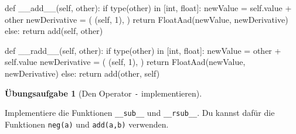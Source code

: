 \documentclass[
  a4paper,
  DIV=11]{scrreprt}
\newenvironment{Shaded}{\begin{snugshade}}{\end{snugshade}}
\newcommand{\BuiltInTok}[1]{\textcolor[rgb]{0.00,0.23,0.31}{#1}}
\newcommand{\ControlFlowTok}[1]{\textcolor[rgb]{0.00,0.23,0.31}{#1}}
\newcommand{\DecValTok}[1]{\textcolor[rgb]{0.68,0.00,0.00}{#1}}
\newcommand{\FunctionTok}[1]{\textcolor[rgb]{0.28,0.35,0.67}{#1}}
\newcommand{\KeywordTok}[1]{\textcolor[rgb]{0.00,0.23,0.31}{#1}}
\newcommand{\NormalTok}[1]{\textcolor[rgb]{0.00,0.23,0.31}{#1}}
\newcommand{\OperatorTok}[1]{\textcolor[rgb]{0.37,0.37,0.37}{#1}}
\newcommand{\VariableTok}[1]{\textcolor[rgb]{0.07,0.07,0.07}{#1}}
\theoremstyle{definition}
\newtheorem{exercise}{Übungsaufgabe}[chapter]
\theoremstyle{definition}
\theoremstyle{remark}
\begin{document}
\begin{Shaded}
\begin{Highlighting}[]
\KeywordTok{def} \FunctionTok{\_\_add\_\_}\NormalTok{(}\VariableTok{self}\NormalTok{, other):}
    \ControlFlowTok{if} \BuiltInTok{type}\NormalTok{(other) }\KeywordTok{in}\NormalTok{ [}\BuiltInTok{int}\NormalTok{, }\BuiltInTok{float}\NormalTok{]:}
\NormalTok{        newValue }\OperatorTok{=} \VariableTok{self}\NormalTok{.value }\OperatorTok{+}\NormalTok{ other}
\NormalTok{        newDerivative }\OperatorTok{=}\NormalTok{ (}
\NormalTok{            (}\VariableTok{self}\NormalTok{, }\DecValTok{1}\NormalTok{),}
\NormalTok{        )}
        \ControlFlowTok{return}\NormalTok{ FloatAad(newValue, newDerivative)}
    \ControlFlowTok{else}\NormalTok{:}
        \ControlFlowTok{return}\NormalTok{ add(}\VariableTok{self}\NormalTok{, other)}
    
\KeywordTok{def} \FunctionTok{\_\_radd\_\_}\NormalTok{(}\VariableTok{self}\NormalTok{, other):}
    \ControlFlowTok{if} \BuiltInTok{type}\NormalTok{(other) }\KeywordTok{in}\NormalTok{ [}\BuiltInTok{int}\NormalTok{, }\BuiltInTok{float}\NormalTok{]:}
\NormalTok{        newValue }\OperatorTok{=}\NormalTok{ other }\OperatorTok{+} \VariableTok{self}\NormalTok{.value}
\NormalTok{        newDerivative }\OperatorTok{=}\NormalTok{ (}
\NormalTok{            (}\VariableTok{self}\NormalTok{, }\DecValTok{1}\NormalTok{),}
\NormalTok{        )}
        \ControlFlowTok{return}\NormalTok{ FloatAad(newValue, newDerivative)}
    \ControlFlowTok{else}\NormalTok{:}
        \ControlFlowTok{return}\NormalTok{ add(other, }\VariableTok{self}\NormalTok{)}
\end{Highlighting}
\end{Shaded}

\begin{exercise}[Den Operator \texttt{-}
implementieren]\protect\hypertarget{exr-AadMinusOp}{}\label{exr-AadMinusOp}

Implementiere die Funktionen \texttt{\_\_sub\_\_} und
\texttt{\_\_rsub\_\_}. Du kannst dafür die Funktionen \texttt{neg(a)}
und \texttt{add(a,b)} verwenden.

\end{exercise}
\end{document}

